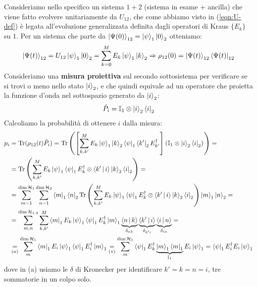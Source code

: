 \documentclass[../../InformazioneQuantistica.tex]{subfiles}
\begin{document}
\begin{figure}[H]
    \centering
    
\end{figure}

Consideriamo nello specifico un sistema $1+2$ (sistema in esame + ancilla) che viene fatto evolvere unitariamente da $U_{12}$, che come abbiamo visto in (\ref{eqn:U-def}) è legata all'evoluzione generalizzata definita dagli operatori di Kraus $\{E_k\}$ su $1$. Per un sistema che parte da $\Ket{\Psi(0)}_{12}=\Ket{\psi}_1\Ket{0}_2$ otteniamo:
\begin{align*}
\Ket{\Psi(t)}_{12}=U_{12}\Ket{\psi}_1 \Ket{0}_2 = \sum_{k=0}^M E_k \Ket{\psi}_1 \Ket{k}_2 \Rightarrow \rho_{12}(0)=\Ket{\Psi(t)}_{12}\Bra{\Psi(t)}_{12}
\end{align*}
Consideriamo una \textbf{misura proiettiva} sul secondo sottosistema per verificare se si trovi o meno nello stato $\Ket{i}_2$, e che quindi equivale ad un operatore che proietta la funzione d'onda nel sottospazio generato da $\Ket{i}_2$:
\begin{align*}
\hat{P}_i = \mathbb{I}_1 \otimes \Ket{i}_2\Bra{i}_2
\end{align*}
Calcoliamo la probabilità di ottenere $i$ dalla misura: %
\begin{align*}
p_i &= \operatorname{Tr}(\rho_{12}(t)\hat{P}_i) = \operatorname{Tr}\left( \left[\sum_{k,k'}^ME_k\Ket{\psi}_1\Ket{k}_2\Bra{\psi}_1\Bra{k'}_2E_{k'}^\dag \right](\mathbb{I}_1 \otimes \Ket{i}_2\Bra{i}_2)\right) =\\
&= \operatorname{Tr}\left( \sum_{k,k'}^M E_k \Ket{\psi}_1 \Bra{\psi}_1 E_k^\dag \otimes {\Braket{k'|i}}\Ket{k}_2 \Bra{i}_2\right) =\\
&=\sum_{m=1}^{\operatorname{dim}\mathcal{H}_1} \sum_{n=1}^{\operatorname{dim}\mathcal{H}_2} \Bra{m}_1 \Bra{n}_2 \operatorname{Tr}\left( \sum_{k,k'}^M E_k \Ket{\psi}_1 \Bra{\psi}_1 E_k^\dag \otimes {\Braket{k'|i}}\Ket{k}_2 \Bra{i}_2\right) \Ket{m}_1 \Ket{n}_2 = \\
&= \sum_{m,n}^{\operatorname{dim}\mathcal{H}_{1,2}} \sum_{k,k'}^M \Bra{m}_1 E_k \Ket{\psi}_1 \Bra{\psi}_1 E_k^\dag \Ket{m}_1 \underbrace{\Braket{n|k}}_{\delta_{nk}}\underbrace{\Braket{k'|i}}_{\delta_{k'i}}\underbrace{\Braket{i|n}}_{\delta_{in}} = \\
&\underset{(a)}{=} \sum_{m}^{\operatorname{dim}\mathcal{H}_1} \Bra{m}_1 E_i \Ket{\psi}_1 \Bra{\psi}_1 E_i^\dag \Ket{m}_1 \underset{(*)}{=} \sum_{m}^{\operatorname{dim}\mathcal{H}_1} \Bra{\psi}_1 E_k^\dag \underbrace{\Ket{m}_1 \Bra{m}_1}_{\mathbb{I}_1} E_i \Ket{\psi}_1 = \Bra{\psi}_1 E_i^\dag E_i \Ket{\psi}_1
\end{align*}
dove in (a) usiamo le $\delta$ di Kronecker per identificare $k'=k=n=i$,  tre sommatorie in un colpo solo.
\end{document}
